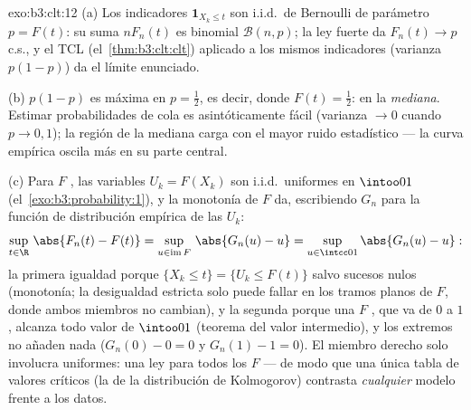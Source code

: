 \begin{solution}{exo:b3:clt:12}
(a) Los indicadores $\mathbf 1_{X_k \leq t}$ son i.i.d.\ de Bernoulli de
parámetro $p = F(t)$: su suma $nF_n(t)$ es binomial $\mathcal B(n, p)$;
la ley fuerte da $F_n(t)
\to p$ c.s., y el TCL (el~\cref{thm:b3:clt:clt}) aplicado a los mismos
indicadores (varianza $p(1-p)$) da el límite
 enunciado.

(b) $p(1 - p)$ es máxima en $p = \frac12$, es decir, donde
$F(t) = \frac12$: en la \emph{mediana}. Estimar probabilidades de cola
es asintóticamente fácil (varianza $\to 0$ cuando $p \to 0, 1$); la
región de la mediana carga con el mayor ruido estadístico --- la curva
empírica oscila más en su parte central.

(c) Para $F$ , las
variables $U_k = F(X_k)$ son i.i.d.\ uniformes en $\intoo01$
(el~\cref{exo:b3:probability:1}), y la monotonía de $F$ da, escribiendo
$G_n$ para la función de distribución empírica de las $U_k$:
\[
\sup_{t\in\R}\,\abs{F_n(t) - F(t)}
= \sup_{u \in \operatorname{im}F}\,\abs{G_n(u) - u}
= \sup_{u\in\intcc01}\abs{G_n(u) - u} :
\]
la primera igualdad porque $\{X_k \leq t\} = \{U_k \leq
F(t)\}$ salvo sucesos nulos (monotonía; la desigualdad estricta solo
puede fallar en los tramos planos de $F$, donde ambos miembros no
cambian), y la segunda porque una $F$
, que va de $0$ a $1$,
alcanza todo valor de $\intoo01$ (teorema del valor intermedio), y los
extremos no añaden nada ($G_n(0) - 0 = 0$ y $G_n(1) - 1 = 0$). El
miembro derecho solo involucra uniformes: una ley para todos los $F$ ---
de modo que una única tabla de valores críticos (la de la distribución
de Kolmogorov) contrasta \emph{cualquier} modelo
 frente a los datos.
\end{solution}

